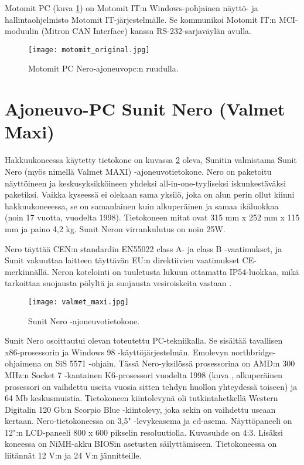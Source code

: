 Motomit PC (kuva \ref{motomit:kuvankaappaus}) on Motomit IT:n Windows-pohjainen näyttö- ja hallintaohjelmisto Motomit IT-järjestelmälle. Se kommunikoi Motomit IT:n MCI-moduulin (Mitron CAN Interface) kanssa RS-232-sarjaväylän avulla\cite{motomit:esite}.
\newline
\begin{figure}[H]
\centering
\texttt{[image: motomit\_original.jpg]}
\caption{Motomit PC Nero-ajoneuvopc:n ruudulla.}
\label{motomit:kuvankaappaus}
\end{figure}

\section{Ajoneuvo-PC Sunit Nero (Valmet Maxi)}

Hakkuukoneessa käytetty tietokone on kuvassa \ref{kuva_nero} oleva, Sunitin valmistama Sunit Nero (myös nimellä Valmet MAXI) -ajoneuvotietokone. Nero on paketoitu näyttöineen ja keskusyksikköineen yhdeksi all-in-one-tyyliseksi iskunkestäväksi paketiksi. Vaikka kyseessä ei olekaan sama yksilö, joka on alun perin ollut kiinni hakkuukoneeessa, se on samanlainen kuin alkuperäinen ja samaa ikäluokkaa (noin 17 vuotta, vuodelta 1998). Tietokoneen mitat ovat 315 mm x 252 mm x 115 mm ja paino 4,2 kg. Sunit Neron virrankulutus on noin 25W.

Nero täyttää CEN:n standardin EN55022 class A- ja class B -vaatimukset, ja Sunit vakuuttaa laitteen täyttävän EU:n direktiivien vaatimukset CE-merkinnällä. Neron kotelointi on tuuletusta lukuun ottamatta IP54-luokkaa, mikä tarkoittaa suojausta pölyltä ja suojausta vesiroiskeita vastaan \cite{nero:manual}.

\begin{figure}[H]
\centering
\texttt{[image: valmet\_maxi.jpg]}
\caption{Sunit Nero -ajoneuvotietokone.}
\label{kuva_nero}
\end{figure}

Sunit Nero osoittautui olevan toteutettu PC-tekniikalla. Se sisältää tavallisen x86-prosessorin ja Windows 98 -käyttöjärjestelmän. Emolevyn northbridge-ohjaimena on SiS 5571 -ohjain. Tässä Nero-yksilössä prosessorina on AMD:n 300 MHz:n Socket 7 -kantainen K6-prosessori vuodelta 1998 (kuva \label{kuva_prossu}, alkuperäinen prosessori on vaihdettu useita vuosia sitten tehdyn huollon yhteydessä toiseen) ja 64 Mb keskusmuistia. Tietokoneen kiintolevynä oli tutkintahetkellä Western Digitalin 120 Gb:n Scorpio Blue -kiintolevy, joka sekin on vaihdettu useaan kertaan. Nero-tietokoneessa on 3,5" -levykeasema ja cd-asema. Näyttöpaneeli on 12":n LCD-paneeli 800 x 600 pikselin resoluutiolla. Kuvasuhde on 4:3. Lisäksi koneessa on NiMH-akku BIOSin asetusten säilyttämiseen. Tietokoneessa on liitännät 12 V:n ja 24 V:n jännitteille\cite{nero:manual}.
\newline\newline

